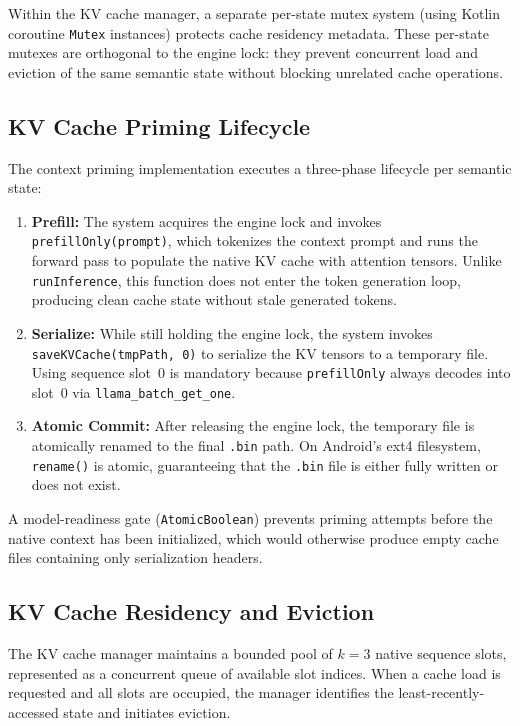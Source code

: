 Within the KV cache manager, a separate per-state mutex system (using Kotlin coroutine \texttt{Mutex} instances) protects cache residency metadata. These per-state mutexes are orthogonal to the engine lock: they prevent concurrent load and eviction of the same semantic state without blocking unrelated cache operations.

\subsection{KV Cache Priming Lifecycle}
\label{sec:priming}

The context priming implementation executes a three-phase lifecycle per semantic state:

\begin{enumerate}
    \item \textbf{Prefill:} The system acquires the engine lock and invokes \texttt{prefillOnly(prompt)}, which tokenizes the context prompt and runs the forward pass to populate the native KV cache with attention tensors. Unlike \texttt{runInference}, this function does not enter the token generation loop, producing clean cache state without stale generated tokens.

    \item \textbf{Serialize:} While still holding the engine lock, the system invokes \texttt{saveKVCache(tmpPath, 0)} to serialize the KV tensors to a temporary file. Using sequence slot~0 is mandatory because \texttt{prefillOnly} always decodes into slot~0 via \texttt{llama\_batch\_get\_one}.

    \item \textbf{Atomic Commit:} After releasing the engine lock, the temporary file is atomically renamed to the final \texttt{.bin} path. On Android's ext4 filesystem, \texttt{rename()} is atomic, guaranteeing that the \texttt{.bin} file is either fully written or does not exist.
\end{enumerate}

A model-readiness gate (\texttt{AtomicBoolean}) prevents priming attempts before the native context has been initialized, which would otherwise produce empty cache files containing only serialization headers.

\subsection{KV Cache Residency and Eviction}
\label{sec:eviction}

The KV cache manager maintains a bounded pool of $k = 3$ native sequence slots, represented as a concurrent queue of available slot indices. When a cache load is requested and all slots are occupied, the manager identifies the least-recently-accessed state and initiates eviction.

